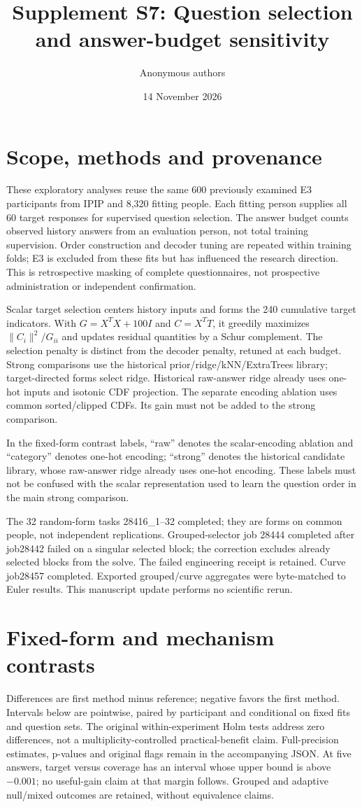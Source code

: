\documentclass[10pt]{article}
\title{Supplement S7: Question selection and answer-budget sensitivity}
\author{Anonymous authors}\date{14 November 2026}
\begin{document}
\maketitle
\section{Scope, methods and provenance}
These exploratory analyses reuse the same 600 previously examined E3 participants
from IPIP and 8,320 fitting people. Each fitting person supplies all 60 target
responses for supervised question selection. The answer budget counts observed
history answers from an evaluation person, not total training supervision.
Order construction and decoder tuning are repeated within training folds;
E3 is excluded from these fits but has influenced the research direction.
This is retrospective masking of complete questionnaires, not prospective
administration or independent confirmation.

Scalar target selection centers history inputs and forms the 240 cumulative
target indicators. With $G=X^TX+100I$ and $C=X^TT$, it greedily maximizes
$\|C_i\|^2/G_{ii}$ and updates residual quantities by a Schur complement.
The selection penalty is distinct from the decoder penalty, retuned at each
budget. Strong comparisons use the historical prior/ridge/kNN/ExtraTrees library;
target-directed forms select ridge. Historical raw-answer ridge already uses
one-hot inputs and isotonic CDF projection. The separate encoding ablation uses
common sorted/clipped CDFs. Its gain must not be added to the strong comparison.

In the fixed-form contrast labels, ``raw'' denotes the scalar-encoding ablation
and ``category'' denotes one-hot encoding; ``strong'' denotes the historical
candidate library, whose raw-answer ridge already uses one-hot encoding.
These labels must not be confused with the scalar representation used to learn
the question order in the main strong comparison.

The 32 random-form tasks 28416\_1--32 completed; they are forms on common people,
not independent replications. Grouped-selector job 28444 completed after job28442
failed on a singular selected block; the correction excludes already selected
blocks from the solve. The failed engineering receipt is retained. Curve job28457
completed. Exported grouped/curve aggregates were byte-matched to Euler results.
This manuscript update performs no scientific rerun.

\section{Fixed-form and mechanism contrasts}
Differences are first method minus reference; negative favors the first method.
Intervals below are pointwise, paired by participant and conditional on fixed
fits and question sets. The original within-experiment Holm tests address zero
differences, not a multiplicity-controlled practical-benefit claim. Full-precision
estimates, p-values and original flags remain in the accompanying JSON.
At five answers, target versus coverage has an interval whose upper bound is
above $-0.001$; no useful-gain claim at that margin follows. Grouped and adaptive
null/mixed outcomes are retained, without equivalence claims.
\end{document}
